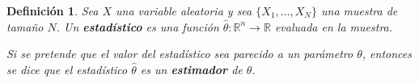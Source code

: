 \documentclass[12pt,letterpaper]{book}
\newtheorem{definicion}{Definición}[chapter]
\newtheorem{teorema}{Teorema}[chapter]
\newtheorem{proposicion}[teorema]{Proposición}
\newcommand{\R}{\mathbb{R}}
\newcommand{\E}[1]{\mathrm{E}\left[ #1 \right]}
\newcommand{\Var}[1]{\mathrm{Var}\left( #1 \right)}
\begin{document}
\begin{definicion}
Sea $X$ una variable aleatoria y sea $\{ X_1, \dots, X_N \}$ una muestra de tamaño $N$.
%
Un \textbf{estadístico} es una función $\widehat{\theta}: \R^{n}\rightarrow\R$ evaluada en la muestra.

Si se pretende que el valor del estadístico sea \textit{parecido} a un parámetro $\theta$, entonces se dice que el estadístico $\widehat{\theta}$ es un \textbf{estimador} de $\theta$.
\end{definicion}




\end{document}
